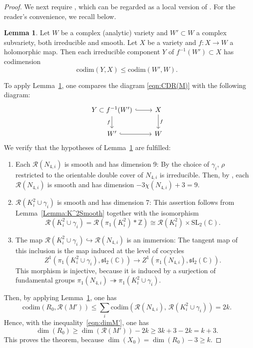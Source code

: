 \documentclass[12pt,reqno]{amsart}
\theoremstyle{definition}
\newtheorem{lemma}[theorem]{Lemma}
\def\calR{\mathcal R}
\begin{document}
\begin{proof}
    We next require \cite[Lemma~6.12]{PortiDim}, which can be regarded as a local version of \cite[Proposition~1]{FalbelGuilloux}. For the reader’s convenience, we recall \cite[Lemma~6.12]{PortiDim} below.

    \begin{lemma}
    \label{Lemma:codims}
        Let $W$ be a complex (analytic) variety and $W'\subset W$ a complex subvariety,
        both irreducible and smooth.
        Let $X$ be a variety and $f\colon X\to W$ a holomorphic map. Then each 
        irreducible component 
        $Y$ of $ f^{-1}(W')\subset X$ has codimension
        $$
            \mathrm{codim}(Y, X)\leq \mathrm{codim}(W',W).
        $$
    \end{lemma}

  
To apply Lemma~\ref{Lemma:codims}, one compares the
diagram \eqref{eqn:CDR(M)}
with the following diagram:
\begin{equation}
    \label{eqn:X}
    \begin{tikzcd}
            Y\subset f^{-1}(W')
         \arrow[r, hookrightarrow] \arrow[d, "f"'] &
            X \arrow[d, "f"] \\
            W' \arrow[r, hookrightarrow] & W
        \end{tikzcd}
    \end{equation}
    We verify that the hypotheses of Lemma~\ref{Lemma:codims} are fulfilled:
     \begin{enumerate}
         \item Each $\calR(N_{4,i})$ is smooth and has dimension 9:
         By the choice of $\gamma_i$, $\rho$ restricted to the orientable double cover of
         $N_{4,i}$ is irreducible. Then, by \cite[Proposition~4.2]{PortiDim},
         each $\calR(N_{4,i})$ is smooth and has dimension $-3\chi(N_{4,i})+3=9$.
         \item $\calR(K^2_i\cup \gamma_i)$ is smooth and has dimension 7:
         This assertion follows from Lemma~\ref{Lemma:K^2Smooth} together with the isomorphism 
         $$
         \calR(K^2_i\cup \gamma_i)=\calR(\pi_1(K^2_i)*\mathbb Z)\cong \calR(K^2_i)\times \mathrm{SL}_2(\mathbb C). 
         $$
         \item The map 
         $\calR(K^2_i\cup \gamma_i)\hookrightarrow \calR(N_{4,i})$ is an immersion:
         The tangent map of this inclusion is the map induced at the level of cocycles
         $$Z^1(\pi_1 (K^2_i\cup \gamma_i), \mathfrak{sl}_2(\mathbb C))\to 
         Z^1(\pi_1(N_{4,i}), \mathfrak{sl}_2(\mathbb C)).$$
         This morphism is injective, because it is induced by a surjection
         of fundamental groups
         $ \pi_1(N_{4,i}) \twoheadrightarrow    \pi_1 (K^2_i\cup \gamma_i)$.
         \end{enumerate}
         Then, by applying Lemma~\ref{Lemma:codims}, one has
         $$
            \mathrm{codim}( R_0, \calR(M') )\leq 
            \sum_i \mathrm{codim} (\calR(N_{4,i}) ,\, \calR(K^2_i\cup \gamma_i))  = 2 k.
        $$
        Hence,  with the inequality~\eqref{eqn:dimM'}, one has
        $$
        \dim( R_0)\geq \dim( \calR(M'))-2k\geq 3k+3-2k=k+3.
        $$
        This proves the theorem, because $\dim (X_0)=\dim (R_0)-3 \geq k$.
\end{proof}
\end{document}
